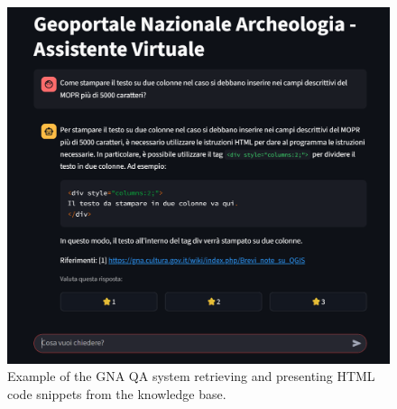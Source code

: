 \begin{spacing}{1.5}
\begin{figure}[H]
  \centering
  \includegraphics[width=\textwidth]{images/risposta_assistente_con_codice.png} 
  \caption{Example of the GNA QA system retrieving and presenting HTML code snippets from the knowledge base.}
  \label{fig:edge-case_code}
\end{figure}


\end{spacing}